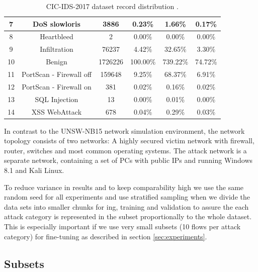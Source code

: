 \begin{table}[H]
\begin{tabular}{cccccc}
		7  & DoS slowloris           & 3886        & 0.23\%                 & 1.66\%                          & 0.17\%                    \\ \midrule
		8  & Heartbleed              & 2           & 0.00\%                 & 0.00\%                          & 0.00\%                    \\ \midrule
		9  & Infiltration            & 76237       & 4.42\%                 & 32.65\%                         & 3.30\%                    \\ \midrule
		10 & Benign                  & 1726226     & 100.00\%               & 739.22\%                        & 74.72\%                   \\ \midrule
		11 & PortScan - Firewall off & 159648      & 9.25\%                 & 68.37\%                         & 6.91\%                    \\ \midrule
		12 & PortScan - Firewall on  & 381         & 0.02\%                 & 0.16\%                          & 0.02\%                    \\ \midrule
		13 & SQL Injection           & 13          & 0.00\%                 & 0.01\%                          & 0.00\%                    \\ \midrule
		14 & XSS WebAttack           & 678         & 0.04\%                 & 0.29\%                          & 0.03\%                   
	\end{tabular}
	\caption{CIC-IDS-2017 dataset record distribution \cite{cic_ids_2017_analysis}.}
	\label{table:methodology:datasets:cic_ids_2017_categories}
\end{table}

In contrast to the UNSW-NB15 network simulation environment, the network topology consists of two networks: A highly secured victim network with firewall, router, switches and most common operating systems. The attack network is a separate network, containing a set of PCs with public IPs and running Windows 8.1 and Kali Linux.

To reduce variance in results and to keep comparability high we use the same random seed for all experiments and use stratified sampling when we divide the data sets into smaller chunks for ing, training and validation to assure the each attack category is represented in the subset proportionally to the whole dataset. This is especially important if we use very small subsets (10 flows per attack category) for fine-tuning as described in section \ref{sec:experiments}. 

\subsection{Subsets} \label{sec:methodology:subsets}

